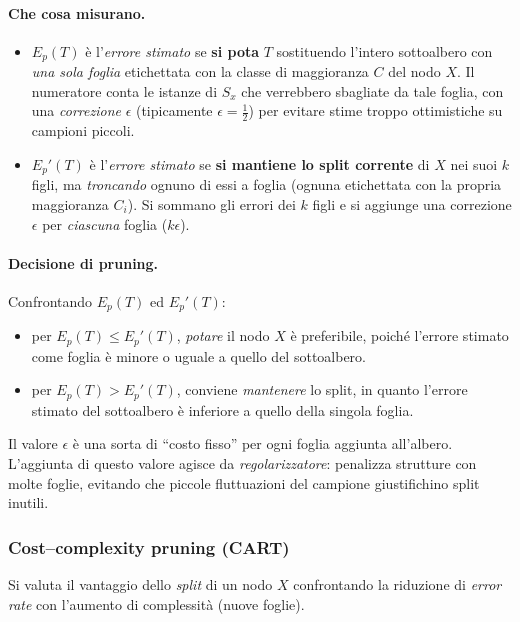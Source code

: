 \paragraph{Che cosa misurano.}
\begin{itemize}
  \item \(E_p(T)\) è l’\emph{errore stimato} se \textbf{si pota} \(T\) sostituendo l’intero sottoalbero con \emph{una sola foglia} etichettata con la classe di maggioranza \(C\) del nodo \(X\). Il numeratore conta le istanze di \(S_x\) che verrebbero sbagliate da tale foglia, con una \emph{correzione} \(\epsilon\) (tipicamente \(\epsilon=\tfrac12\)) per evitare stime troppo ottimistiche su campioni piccoli.
  \item \(E_p'(T)\) è l’\emph{errore stimato} se \textbf{si mantiene lo split corrente} di \(X\) nei suoi \(k\) figli, ma \emph{troncando} ognuno di essi a foglia (ognuna etichettata con la propria maggioranza \(C_i\)). Si sommano gli errori dei \(k\) figli e si aggiunge una correzione \(\epsilon\) per \emph{ciascuna} foglia (\(k\epsilon\)).
\end{itemize}

\paragraph{Decisione di pruning.}
Confrontando \(E_p(T)\) ed \(E_p'(T)\):
\begin{itemize}
  \item per \(E_p(T) \le E_p'(T)\), \emph{potare} il nodo \(X\) è preferibile, poiché l’errore stimato come foglia è minore o uguale a quello del sottoalbero.
  \item per \(E_p(T) > E_p'(T)\), conviene \emph{mantenere} lo split, in quanto l’errore stimato del sottoalbero è inferiore a quello della singola foglia.
\end{itemize}

Il valore $\epsilon$ è una sorta di “costo fisso” per ogni foglia aggiunta all’albero. L’aggiunta di questo valore agisce da \emph{regolarizzatore}: penalizza strutture con molte foglie, evitando che piccole fluttuazioni del campione giustifichino split inutili.

\subsubsection*{Cost–complexity pruning (CART)}
Si valuta il vantaggio dello \emph{split} di un nodo \(X\) confrontando la riduzione di \emph{error rate} con l’aumento di complessità (nuove foglie).

